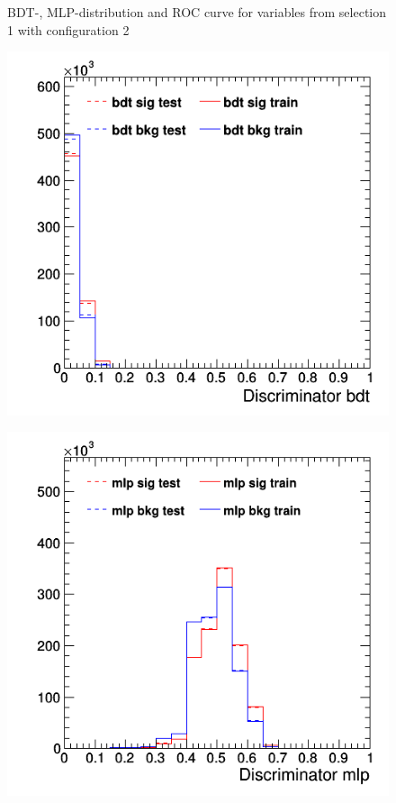 \documentclass[11pt]{scrartcl}
\begin{document}
\begin{figure}[H]
	\caption{BDT-, MLP-distribution and ROC curve for variables from selection 1 with configuration 2}
	 \label{fig:ROC_s1_config2}
	\end{figure}
	
	\begin{figure}[H]
	\centering
	\begin{minipage}{.5\textwidth}
	  \centering
	  \includegraphics[width=0.75\linewidth]{figures/MVA/select1/config3/discriminator_bdt.png}
	  \label{fig:distr_s1_config3_bdt}
	\end{minipage}%
	\begin{minipage}{.5\textwidth}
	  \centering
	  \includegraphics[width=0.75\linewidth]{figures/MVA/select1/config3/discriminator_mlp.png}

\end{minipage}
\end{figure}
\end{document}
